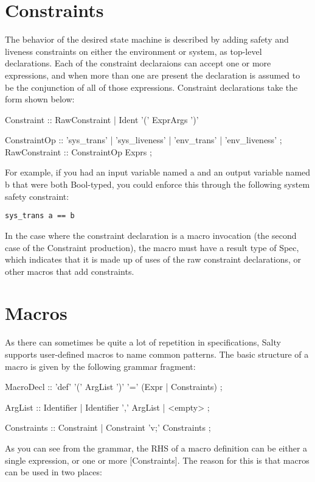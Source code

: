 \section{Constraints}

The behavior of the desired state machine is described by adding safety and liveness constraints on either the environment or system, as top-level declarations. Each of the constraint declaraions can accept one or more expressions, and when more than one are present the declaration is assumed to be the conjunction of all of those expressions. Constraint declarations take the form shown below:
\begin{Grammar}
  Constraint :: RawConstraint | Ident '(' ExprArgs ')'

  ConstraintOp :: 'sys_trans' | 'sys_liveness'
             | 'env_trans' | 'env_liveness' ;
  RawConstraint :: ConstraintOp Exprs ;
\end{Grammar}

For example, if you had an input variable named a and an output variable named b that were both Bool-typed, you could enforce this through the following system safety constraint:

\begin{lstlisting}
sys_trans a == b
\end{lstlisting}

In the case where the constraint declaration is a macro invocation (the second case of the Constraint production), the macro must have a result type of Spec, which indicates that it is made up of uses of the raw constraint declarations, or other macros that add constraints.

\section{Macros}

As there can sometimes be quite a lot of repetition in specifications, Salty supports user-defined macros to name common patterns. The basic structure of a macro is given by the following grammar fragment:
\begin{Grammar}
  MacroDecl :: 'def' '(' ArgList ')' '=' (Expr | Constraints) ;

  ArgList :: Identifier | Identifier ',' ArgList | <empty> ;

  Constraints :: Constraint | Constraint 'v;' Constraints ;
\end{Grammar}

As you can see from the grammar, the RHS of a macro definition can be either a single expression, or one or more [Constraints]. The reason for this is that macros can be used in two places:

